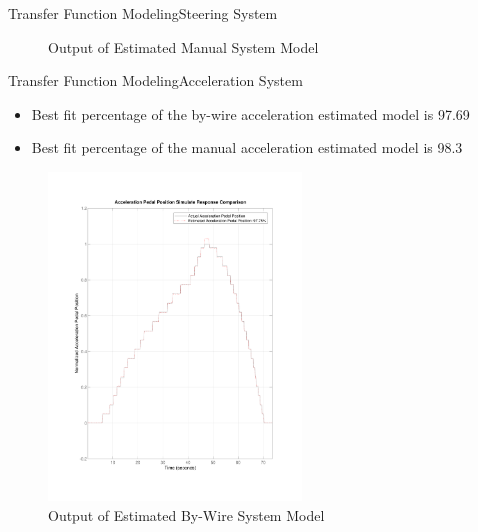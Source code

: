 \documentclass{beamer}
\begin{document}
\begin{frame}{Transfer Function Modeling}{Steering System}
\begin{block}{}
\begin{figure}
\begin{minipage}{0.45\textwidth}
        \caption{Output of Estimated Manual System Model}
        \label{fig:manualSteerModel}
    \end{minipage}
\end{figure}
  \end{block}
\end{frame}



\begin{frame}{Transfer Function Modeling}{Acceleration System}
	\begin{block}{}
 \begin{itemize}
	\item Best fit percentage of the by-wire acceleration estimated model is 97.69
	\item Best fit percentage of the manual acceleration estimated model is 98.3
 \end{itemize}
 \begin{figure}
    \centering
    \begin{minipage}{0.45\textwidth}
        \centering
        \includegraphics[width=0.6\textwidth]{figs/img/byWireAccelArxModel} %
        \caption{Output of Estimated By-Wire System Model}
        \label{fig:byWireAccelModel}
    \end{minipage}\hfill
    \begin{minipage}{0.45\textwidth}
        \centering

\end{minipage}
\end{figure}
\end{block}
\end{frame}
\end{document}
